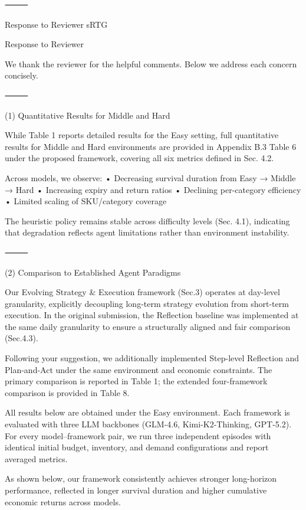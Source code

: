 ⸻

Response to Reviewer sRTG







Response to Reviewer

We thank the reviewer for the helpful comments. Below we address each concern concisely.

⸻

(1) Quantitative Results for Middle and Hard

While Table 1 reports detailed results for the Easy setting, full quantitative results for Middle and Hard environments are provided in Appendix B.3 Table 6 under the proposed framework, covering all six metrics defined in Sec. 4.2.

Across models, we observe:
	•	Decreasing survival duration from Easy → Middle → Hard
	•	Increasing expiry and return ratios
	•	Declining per-category efficiency
	•	Limited scaling of SKU/category coverage

The heuristic policy remains stable across difficulty levels (Sec. 4.1), indicating that degradation reflects agent limitations rather than environment instability.

⸻

(2) Comparison to Established Agent Paradigms

Our Evolving Strategy & Execution framework (Sec.3) operates at day-level granularity, explicitly decoupling long-term strategy evolution from short-term execution. In the original submission, the Reflection baseline was implemented at the same daily granularity to ensure a structurally aligned and fair comparison (Sec.4.3).

Following your suggestion, we additionally implemented Step-level Reflection and Plan-and-Act under the same environment and economic constraints. The primary comparison is reported in Table 1; the extended four-framework comparison is provided in Table 8.

All results below are obtained under the Easy environment. Each framework is evaluated with three LLM backbones (GLM-4.6, Kimi-K2-Thinking, GPT-5.2). For every model–framework pair, we run three independent episodes with identical initial budget, inventory, and demand configurations and report averaged metrics.

As shown below, our framework consistently achieves stronger long-horizon performance, reflected in longer survival duration and higher cumulative economic returns across models.

